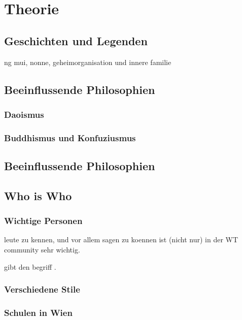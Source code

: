 

\renewcommand\chapterillustration{pushing_minimalistisch}
\chapter{Theorie}



\section{Geschichten und Legenden}

ng mui, nonne, geheimorganisation und innere familie


\section{Beeinflussende Philosophien}

\subsection{Daoismus}

\subsection{Buddhismus und Konfuziusmus}


\section{Beeinflussende Philosophien}


\section{Who is Who}

\subsection{Wichtige Personen}

leute zu kennen, und vor allem sagen zu koennen  ist (nicht nur) in der WT community sehr wichtig.

gibt den begriff .

\subsection{Verschiedene Stile}

\subsection{Schulen in Wien}


